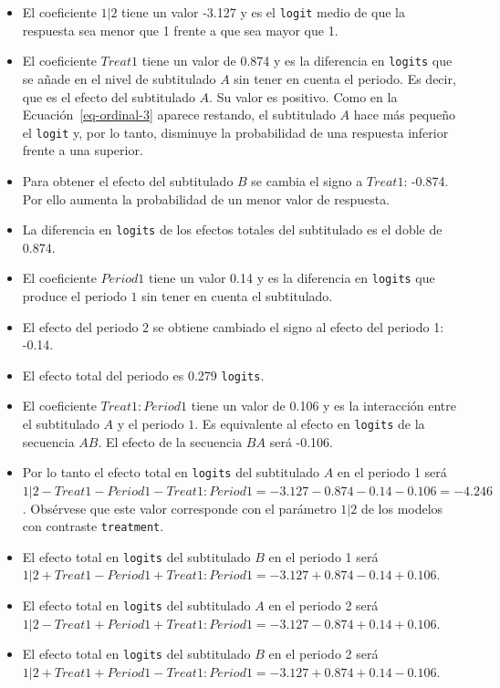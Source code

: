 \documentclass[
  12pt,
  a4paper,
  extrafontsizes,
  onecolumn,
  openright,
  table]{memoir}
\providecommand{\tightlist}{%
  \setlength{\itemsep}{0pt}\setlength{\parskip}{0pt}}\usepackage{longtable,booktabs,array}
\begin{document}
\begin{itemize}
\tightlist
\item
  El coeficiente \(1|2\) tiene un valor -3.127 y es el \texttt{logit}
  medio de que la respuesta sea menor que 1 frente a que sea mayor que
  1.
\item
  El coeficiente \(Treat1\) tiene un valor de 0.874 y es la diferencia
  en \texttt{logits} que se añade en el nivel de subtitulado \(A\) sin
  tener en cuenta el periodo. Es decir, que es el efecto del subtitulado
  \(A\). Su valor es positivo. Como en la Ecuación~\ref{eq-ordinal-3}
  aparece restando, el subtitulado \(A\) hace más pequeño el
  \texttt{logit} y, por lo tanto, disminuye la probabilidad de una
  respuesta inferior frente a una superior.
\item
  Para obtener el efecto del subtitulado \(B\) se cambia el signo a
  \(Treat1\): -0.874. Por ello aumenta la probabilidad de un menor valor
  de respuesta.
\item
  La diferencia en \texttt{logits} de los efectos totales del
  subtitulado es el doble de 0.874.
\item
  El coeficiente \(Period1\) tiene un valor 0.14 y es la diferencia en
  \texttt{logits} que produce el periodo \(1\) sin tener en cuenta el
  subtitulado.
\item
  El efecto del periodo \(2\) se obtiene cambiado el signo al efecto del
  periodo 1: -0.14.
\item
  El efecto total del periodo es 0.279 \texttt{logits}.
\item
  El coeficiente \(Treat1:Period1\) tiene un valor de 0.106 y es la
  interacción entre el subtitulado \(A\) y el periodo \(1\). Es
  equivalente al efecto en \texttt{logits} de la secuencia \(AB\). El
  efecto de la secuencia \(BA\) será -0.106.
\item
  Por lo tanto el efecto total en \texttt{logits} del subtitulado \(A\)
  en el periodo 1 será
  \(1|2 - Treat1 - Period1 - Treat1:Period1 = -3.127 - 0.874 - 0.14 - 0.106 = -4.246\).
  Obsérvese que este valor corresponde con el parámetro \(1|2\) de los
  modelos con contraste \texttt{treatment}.
\item
  El efecto total en \texttt{logits} del subtitulado \(B\) en el periodo
  1 será
  \(1|2 + Treat1 - Period1 + Treat1:Period1 = -3.127 + 0.874 - 0.14 + 0.106\).
\item
  El efecto total en \texttt{logits} del subtitulado \(A\) en el periodo
  2 será
  \(1|2 - Treat1 + Period1 + Treat1:Period1 = -3.127 - 0.874 + 0.14 + 0.106\).
\item
  El efecto total en \texttt{logits} del subtitulado \(B\) en el periodo
  2 será
  \(1|2 + Treat1 + Period1 - Treat1:Period1 = -3.127 + 0.874 + 0.14 - 0.106\).
\end{itemize}
\end{document}
